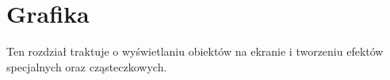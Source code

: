 \chapter{Grafika}
\thispagestyle{chapterBeginStyle}
\label{chapter_graphics}

Ten rozdział traktuje o wy\'swietlaniu obiektów na ekranie i tworzeniu efektów specjalnych oraz cząsteczkowych.

\cleardoublepage